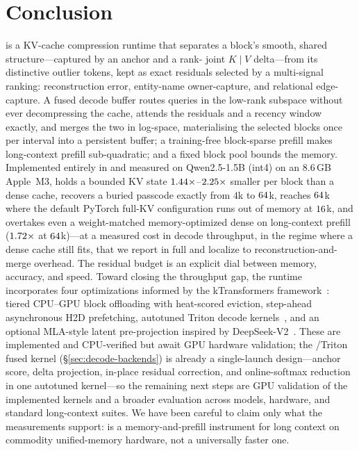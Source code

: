 \section{Conclusion}
\label{sec:conclusion}

\dkv{} is a KV-cache compression runtime that separates a block's smooth, shared structure---captured
by an anchor and a rank-\rank{} joint $K\!\mid\!V$ delta---from its distinctive outlier tokens, kept
as exact residuals selected by a multi-signal ranking: reconstruction error, entity-name owner-capture,
and relational edge-capture. A fused decode buffer routes queries in the low-rank subspace without
ever decompressing the cache, attends the residuals and a recency window exactly, and merges the
two in log-space, materialising the selected blocks once per interval into a persistent buffer;
a training-free block-sparse prefill makes long-context prefill sub-quadratic; and a fixed block
pool bounds the memory. Implemented entirely in \mlxe{} and measured on Qwen2.5-1.5B (int4) on an
$8.6$\,GB Apple~M3, \dkv{} holds a bounded KV
state $1.44\times$--$2.25\times$ smaller per block than a dense cache, recovers a
buried passcode exactly from $4$k to $64$k, reaches $64$k where the default PyTorch full-KV
configuration runs out of memory at $16$k, and overtakes even a weight-matched memory-optimized
dense on long-context prefill ($1.72\times$ at $64$k)---at a measured cost in decode
throughput, in the regime where a dense cache still fits, that we report in full and localize to
reconstruction-and-merge overhead. The residual budget is an explicit dial between memory, accuracy,
and speed. Toward closing the throughput gap, the runtime incorporates four optimizations
informed by the kTransformers framework~\cite{yang2025ktransformers}: tiered CPU--GPU block
offloading with heat-scored eviction, step-ahead asynchronous H2D prefetching, autotuned Triton
decode kernels~\cite{tillet2019triton}, and an optional MLA-style latent pre-projection inspired by
DeepSeek-V2~\cite{deepseekv2}. These are implemented and CPU-verified but await GPU hardware
validation; the \cuda{}/Triton fused kernel (\S\ref{sec:decode-backends}) is already a single-launch
design---anchor score, delta projection, in-place residual correction, and online-softmax reduction
in one autotuned kernel---so the remaining next steps are GPU validation of the implemented kernels
and a broader evaluation across models, hardware, and standard long-context suites. We have been
careful to claim only what the measurements support: \dkv{} is a memory-and-prefill instrument for
long context on commodity unified-memory hardware, not a universally faster one.
